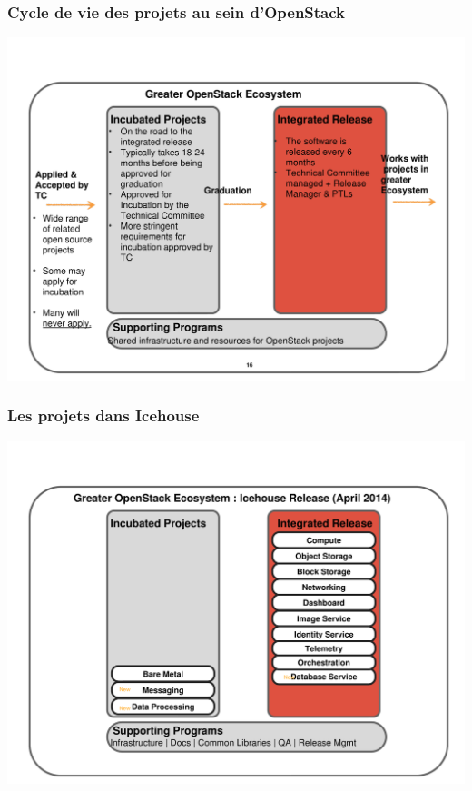   \begin{frame}
    \frametitle{Cycle de vie des projets au sein d'OpenStack}
    \includegraphics[width=\textwidth]{images/innovation1.pdf}
  \end{frame}

  \begin{frame}
    \frametitle{Les projets dans Icehouse}
    \includegraphics[width=\textwidth]{images/innovation2.pdf}
  \end{frame}

